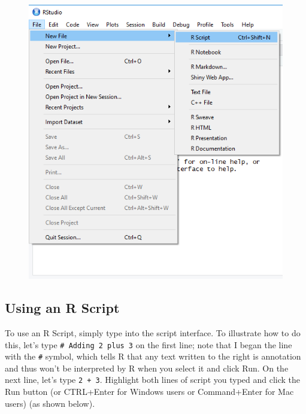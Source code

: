 \documentclass[]{book}
\begin{document}
\begin{figure}
\centering
\includegraphics{New R Script.png}
\caption{}
\end{figure}

\subsection{Using an R Script}\label{using-an-r-script}

To use an R Script, simply type into the script interface. To illustrate
how to do this, let's type \texttt{\#\ Adding\ 2\ plus\ 3} on the first
line; note that I began the line with the \texttt{\#} symbol, which
tells R that any text written to the right is annotation and thus won't
be interpreted by R when you select it and click Run. On the next line,
let's type \texttt{2\ +\ 3}. Highlight both lines of script you typed
and click the Run button (or CTRL+Enter for Windows users or
Command+Enter for Mac users) (as shown below).
\end{document}
